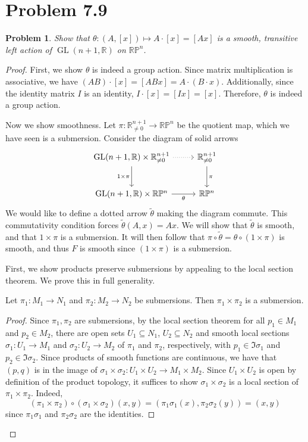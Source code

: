 \documentclass[11pt, letterpaper]{article}
\theoremstyle{plain}
\newtheorem{problem}{Problem}
\begin{document}
\section{Problem 7.9}
\begin{problem}
	Show that $\theta : (A,[x]) \mapsto A\cdot [x]=[Ax]$ is a smooth, transitive left action of $\operatorname{GL} (n+1,\mathbb{R} )$ on $\mathbb{R} \mathbb{P} ^n$.
\end{problem}
\begin{proof}
	First, we show $\theta $ is indeed a group action. Since matrix multiplication is associative, we have $(AB)\cdot [x]=[ABx]=A\cdot (B\cdot x)$. Additionally, since the identity matrix $I$ is an identity, $I\cdot [x]=[Ix]=[x]$. Therefore, $\theta $ is indeed a group action.

	Now we show smoothness. Let $\pi : \mathbb{R}_{\neq 0} ^{n+1}  \to \mathbb{R} \mathbb{P} ^n$ be the quotient map, which we have seen is a submersion. Consider the diagram of solid arrows
	\[\begin{tikzcd}[row sep = 2.5em, column sep = 2.5em]
		\operatorname{GL} (n+1,\mathbb{R} )\times \mathbb{R} ^{n+1}_{\neq 0} \ar[" 1 \times \pi  "', d] \ar[dotted, r]  & \mathbb{R}_{\neq 0} ^{n+1} \ar[" \pi  ", d]  \\
	\operatorname{GL} (n+1,\mathbb{R} )\times \mathbb{R} \mathbb{P}^n \ar[" \theta  "', r]  & \mathbb{R} \mathbb{P}^n
	\end{tikzcd}\]
	We would like to define a dotted arrow $\widetilde{\theta } $ making the diagram commute. This commutativity condition forces $\widetilde{\theta } (A,x)=Ax$. We will show that $\widetilde{\theta } $ is smooth, and that $1\times \pi $ is a submersion. It will then follow that $\pi \circ \widetilde{\theta } =\theta \circ (1\times \pi )$ is smooth, and thus $F$ is smooth since $(1\times \pi )$ is a submersion.

	First, we show products preserve submersions by appealing to the local section theorem. We prove this in full generality.
	\begin{proposition}\label{4.2}
		Let $\pi _1 : M_1 \to N_1$ and $\pi _2 : M_2 \to N_2$ be submersions. Then $\pi _1 \times \pi _2$ is a submersion.
	\end{proposition}
	\begin{proof}
		Since $\pi _1,\pi _2$ are submersions, by the local section theorem for all $p_1\in M_1$ and $p_2\in M_2$, there are open sets $U_1 \subseteq N_1$, $U_2 \subseteq N_2$ and smooth local sections $\sigma_1 : U_1 \to M_1$ and $\sigma _2 : U_2 \to M_2$ of $\pi _1$ and $\pi _2$, respectively, with $p_1\in \Im \sigma _1$ and $p_2\in \Im \sigma _2$. Since products of smooth functions are continuous, we have that $(p,q)$ is in the image of $\sigma _1 \times \sigma _2 : U_1 \times U_2 \to M_1\times M_2$. Since $U_1\times U_2$ is open by definition of the product topology, it suffices to show $\sigma _1\times \sigma _2$ is a local section of $\pi _1\times \pi _2$. Indeed,
		\[
			(\pi _1 \times \pi _2)\circ (\sigma _1\times \sigma _2)(x,y)=(\pi _1\sigma _1(x),\pi _2\sigma _2(y))=(x,y)
		\]
		since $\pi _1\sigma _1$ and $\pi _2\sigma _2$ are the identities.
	\end{proof}
	

\end{proof}
\end{document}
